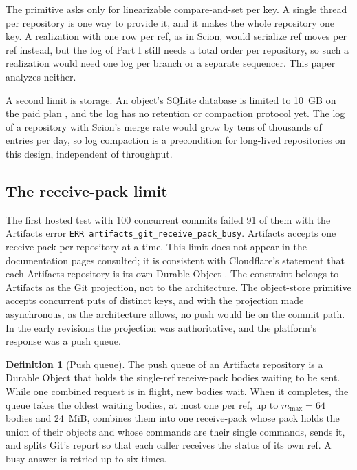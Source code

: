 \documentclass[11pt,letterpaper]{article}
\theoremstyle{definition}
\newtheorem{definition}[theorem]{Definition}
\theoremstyle{remark}
\begin{document}
The primitive asks only for linearizable compare-and-set per key. A single thread per repository is one way to provide it, and it makes the whole repository one key. A realization with one row per ref, as in Scion, would serialize ref moves per ref instead, but the log of Part I still needs a total order per repository, so such a realization would need one log per branch or a separate sequencer. This paper analyzes neither.

A second limit is storage. An object's SQLite database is limited to 10~GB on the paid plan \cite{cfdolimits}, and the log has no retention or compaction protocol yet. The log of a repository with Scion's merge rate would grow by tens of thousands of entries per day, so log compaction is a precondition for long-lived repositories on this design, independent of throughput.

\subsection{The receive-pack limit}

The first hosted test with 100 concurrent commits failed 91 of them with the Artifacts error \texttt{ERR}~\nolinkurl{artifacts_git_receive_pack_busy}. %
Artifacts accepts one receive-pack per repository at a time. This limit does not appear in the documentation pages consulted; it is consistent with Cloudflare's statement that each Artifacts repository is its own Durable Object \cite{carey2026artifacts}. The constraint belongs to Artifacts as the Git projection, not to the architecture. The object-store primitive accepts concurrent puts of distinct keys, and with the projection made asynchronous, as the architecture allows, no push would lie on the commit path. In the early revisions the projection was authoritative, and the platform's response was a push queue.

\begin{definition}[Push queue]
\label{def:sgoc:pushqueue}
The push queue of an Artifacts repository is a Durable Object that holds the single-ref receive-pack bodies waiting to be sent. While one combined request is in flight, new bodies wait. When it completes, the queue takes the oldest waiting bodies, at most one per ref, up to $m_{\max} = 64$ bodies and 24~MiB, combines them into one receive-pack whose pack holds the union of their objects and whose commands are their single commands, sends it, and splits Git's report so that each caller receives the status of its own ref. A busy answer is retried up to six times.
\end{definition}
\end{document}
